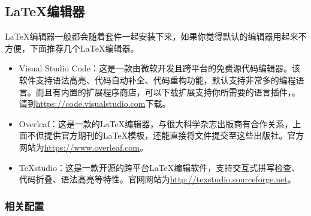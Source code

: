 \subsection{\LaTeX{}编辑器}

\LaTeX{}编辑器一般都会随着套件一起安装下来，如果你觉得默认的编辑器用起来不方便，下面推荐几个\LaTeX{}编辑器。

\begin{itemize}
    \item Visual Studio Code：这是一款由微软开发且跨平台的免费源代码编辑器。该软件支持语法高亮、代码自动补全、代码重构功能，默认支持非常多的编程语言。而且有内置的扩展程序商店，可以下载扩展支持你所需要的语言插件，。请到\url{https://code.visualstudio.com}下载。
    \item Overleaf：这是一款的\LaTeX{}编辑器，与很大科学杂志出版商有合作关系，上面不但提供官方期刊的\LaTeX{}模板，还能直接将文件提交至这些出版社。官方网站为\url{https://www.overleaf.com}。
    \item TeXstudio：这是一款开源的跨平台\LaTeX{}编辑软件，支持交互式拼写检查、代码折叠、语法高亮等特性。官网网站为\url{http://texstudio.sourceforge.net}。
\end{itemize}

\subsubsection{相关配置}


